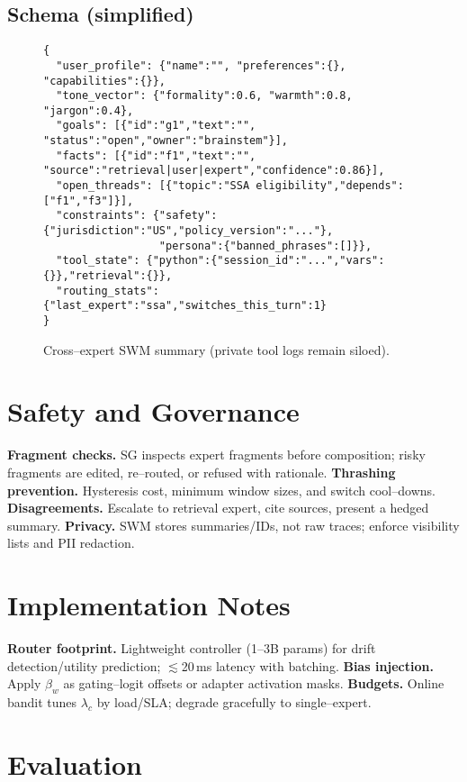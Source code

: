 \documentclass[11pt]{article}
\begin{document}
\subsection{Schema (simplified)}
\begin{figure}[h]
\centering
\begin{minipage}{0.95\linewidth}
\small
\begin{verbatim}
{
  "user_profile": {"name":"", "preferences":{}, "capabilities":{}},
  "tone_vector": {"formality":0.6, "warmth":0.8, "jargon":0.4},
  "goals": [{"id":"g1","text":"", "status":"open","owner":"brainstem"}],
  "facts": [{"id":"f1","text":"", "source":"retrieval|user|expert","confidence":0.86}],
  "open_threads": [{"topic":"SSA eligibility","depends":["f1","f3"]}],
  "constraints": {"safety":{"jurisdiction":"US","policy_version":"..."},
                  "persona":{"banned_phrases":[]}},
  "tool_state": {"python":{"session_id":"...","vars":{}},"retrieval":{}},
  "routing_stats": {"last_expert":"ssa","switches_this_turn":1}
}
\end{verbatim}
\end{minipage}
\caption{Cross--expert SWM summary (private tool logs remain siloed).}
\end{figure}

\section{Safety and Governance}
\textbf{Fragment checks.} SG inspects expert fragments before composition; risky fragments are edited, re--routed, or refused with rationale. \textbf{Thrashing prevention.} Hysteresis cost, minimum window sizes, and switch cool--downs. \textbf{Disagreements.} Escalate to retrieval expert, cite sources, present a hedged summary. \textbf{Privacy.} SWM stores summaries/IDs, not raw traces; enforce visibility lists and PII redaction.

\section{Implementation Notes}
\textbf{Router footprint.} Lightweight controller (1--3B params) for drift detection/utility prediction; $\lesssim$20\,ms latency with batching. \textbf{Bias injection.} Apply $\beta_w$ as gating--logit offsets or adapter activation masks. \textbf{Budgets.} Online bandit tunes $\lambda_c$ by load/SLA; degrade gracefully to single--expert.

\section{Evaluation}
\end{document}
